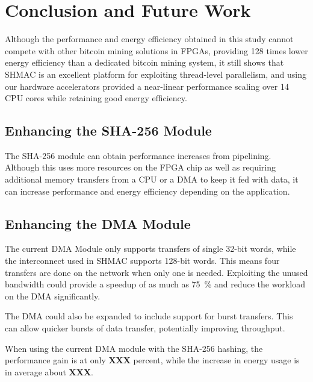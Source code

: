 \chapter{Conclusion and Future Work}
\label{cha:conclusion}

Although the performance and energy efficiency obtained in this study cannot compete
with other bitcoin mining solutions in FPGAs, providing 128 times lower energy efficiency than
a dedicated bitcoin mining system, it still shows that SHMAC is an excellent platform
for exploiting thread-level parallelism, and using our hardware accelerators provided a
near-linear performance scaling over 14 CPU cores while retaining good energy efficiency.

\section{Enhancing the SHA-256 Module}

The SHA-256 module can obtain performance increases from pipelining. Although this uses more
resources on the FPGA chip as well as requiring additional memory transfers from a CPU or a
DMA to keep it fed with data, it can increase performance and energy efficiency depending
on the application.

\section{Enhancing the DMA Module}

The current DMA Module only supports transfers of single 32-bit words, while the interconnect used in SHMAC supports 128-bit words.
This means four transfers are done on the network when only one is needed. Exploiting the unused bandwidth could
provide a speedup of as much as 75~\% and reduce the workload on the DMA significantly.

The DMA could also be expanded to include support for burst transfers. This can allow quicker bursts of data
transfer, potentially improving throughput.

When using the current DMA module with the SHA-256 hashing, the performance gain is at only \textbf{XXX} percent, while the increase in energy usage is in average about  \textbf{XXX}.

